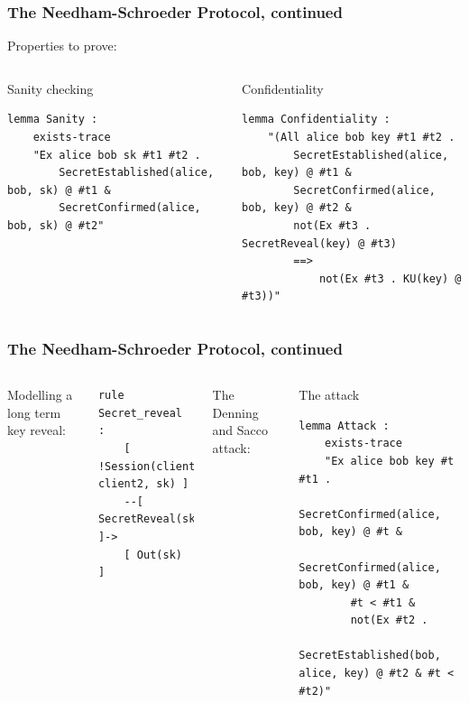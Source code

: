 \documentclass[aspectratio=169,t,xcolor=table]{beamer}
\begin{document}
\begin{frame}[fragile]
    \frametitle{The Needham-Schroeder Protocol, continued}
    Properties to prove:
    \begin{columns}
    \begin{block}{Sanity checking}
    \begin{lstlisting}[language=Tamarin]
lemma Sanity :
    exists-trace
    "Ex alice bob sk #t1 #t2 .
        SecretEstablished(alice, bob, sk) @ #t1 &
        SecretConfirmed(alice, bob, sk) @ #t2"\end{lstlisting}\end{block}
    \begin{block}{Confidentiality}
    \begin{lstlisting}[language=Tamarin]
lemma Confidentiality :
    "(All alice bob key #t1 #t2 .
        SecretEstablished(alice, bob, key) @ #t1 &
        SecretConfirmed(alice, bob, key) @ #t2 &
        not(Ex #t3 . SecretReveal(key) @ #t3)
        ==>
            not(Ex #t3 . KU(key) @ #t3))"\end{lstlisting}\end{block}
    \end{columns}
\end{frame}


\begin{frame}[fragile]
    \frametitle{The Needham-Schroeder Protocol, continued}
    \begin{columns}
    Modelling a long term key reveal:
    \begin{lstlisting}[language=Tamarin]
rule Secret_reveal :
    [ !Session(client1, client2, sk) ]
    --[ SecretReveal(sk) ]->
    [ Out(sk) ]\end{lstlisting}
    The Denning and Sacco attack:
    \begin{block}{The attack}
    \begin{lstlisting}[language=Tamarin]
lemma Attack :
    exists-trace
    "Ex alice bob key #t #t1 . 
        SecretConfirmed(alice, bob, key) @ #t &
        SecretConfirmed(alice, bob, key) @ #t1 &
        #t < #t1 &
        not(Ex #t2 .
            SecretEstablished(bob, alice, key) @ #t2 & #t < #t2)"\end{lstlisting}\end{block}
    \end{columns}
\end{frame}
\end{document}
